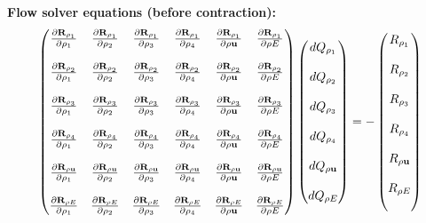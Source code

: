 \documentclass[a4paper]{article}
\begin{document}
\begin{landscape}
\begin{huge}
  \newpage
  \bf{Flow solver equations (before contraction):}
  \begin{equation}
    \begin{pmatrix}
      \tdiff{\rho_1}{\rho_1}   & \tdiff{\rho_2}{\rho_1}   & \tdiff{\rho_3}{\rho_1}   & \tdiff{\rho_4}{\rho_1}   & \tdiff{\rho \vu}{\rho_1}   & \tdiff{\rho E}{\rho_1}   \\ \\
      \tdiff{\rho_1}{\rho_2}   & \tdiff{\rho_2}{\rho_2}   & \tdiff{\rho_3}{\rho_2}   & \tdiff{\rho_4}{\rho_2}   & \tdiff{\rho \vu}{\rho_2}   & \tdiff{\rho E}{\rho_2}   \\ \\
      \tdiff{\rho_1}{\rho_3}   & \tdiff{\rho_2}{\rho_3}   & \tdiff{\rho_3}{\rho_3}   & \tdiff{\rho_4}{\rho_3}   & \tdiff{\rho \vu}{\rho_3}   & \tdiff{\rho E}{\rho_3}   \\ \\
      \tdiff{\rho_1}{\rho_4}   & \tdiff{\rho_2}{\rho_4}   & \tdiff{\rho_3}{\rho_4}   & \tdiff{\rho_4}{\rho_4}   & \tdiff{\rho \vu}{\rho_4}   & \tdiff{\rho E}{\rho_4}   \\ \\
      \tdiff{\rho_1}{\rho \vu} & \tdiff{\rho_2}{\rho \vu} & \tdiff{\rho_3}{\rho \vu} & \tdiff{\rho_4}{\rho \vu} & \tdiff{\rho \vu}{\rho \vu} & \tdiff{\rho E}{\rho \vu} \\ \\
      \tdiff{\rho_1}{\rho E}   & \tdiff{\rho_2}{\rho E}   & \tdiff{\rho_3}{\rho E}   & \tdiff{\rho_4}{\rho E}   & \tdiff{\rho \vu}{\rho E}   & \tdiff{\rho E}{\rho E}
    \end{pmatrix}
    \begin{pmatrix}
      dQ_{\rho_1} \\ \\
      dQ_{\rho_2} \\ \\
      dQ_{\rho_3} \\ \\
      dQ_{\rho_4} \\ \\
      dQ_{\rho \vu} \\ \\
      dQ_{\rho E}
    \end{pmatrix}
    = -
    \begin{pmatrix}
      R_{\rho_1} \\ \\
      R_{\rho_2} \\ \\
      R_{\rho_3} \\ \\
      R_{\rho_4} \\ \\
      R_{\rho \vu} \\ \\
      R_{\rho E} \\ \\
    \end{pmatrix}
    \label{full-flow-right}
  \end{equation}
  \end{huge}
\end{landscape}
\end{document}
